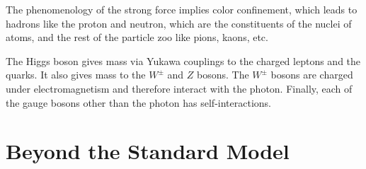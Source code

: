 The phenomenology of the strong force implies color confinement, which leads to hadrons like the proton and neutron, which are the constituents of the nuclei of atoms, and the rest of the particle zoo like pions, kaons, etc.

The Higgs boson gives mass via Yukawa couplings to the charged leptons and the quarks.
It also gives mass to the $W^\pm$ and $Z$ bosons.
The $W^\pm$ bosons are charged under electromagnetism and therefore interact with the photon.
Finally, each of the gauge bosons other than the photon has self-interactions.

\section{Beyond the Standard Model}
\label{sec:SM:BSM}
